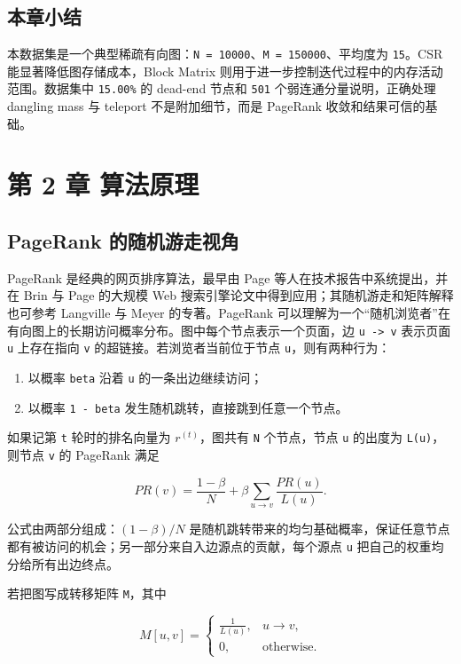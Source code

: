 \documentclass[UTF8,a4paper,12pt]{ctexart}
\begin{document}
\subsection{本章小结}


本数据集是一个典型稀疏有向图：\texttt{N = 10000}、\texttt{M = 150000}、平均度为 \texttt{15}。CSR 能显著降低图存储成本，Block Matrix 则用于进一步控制迭代过程中的内存活动范围。数据集中 \texttt{15.00\%} 的 dead-end 节点和 \texttt{501} 个弱连通分量说明，正确处理 dangling mass 与 teleport 不是附加细节，而是 PageRank 收敛和结果可信的基础。

\section{第 2 章 算法原理}


\subsection{PageRank 的随机游走视角}


PageRank 是经典的网页排序算法，最早由 Page 等人在技术报告中系统提出，并在 Brin 与 Page 的大规模 Web 搜索引擎论文中得到应用；其随机游走和矩阵解释也可参考 Langville 与 Meyer 的专著\cite{page1999pagerank,brin1998anatomy,langville2006google}。PageRank 可以理解为一个“随机浏览者”在有向图上的长期访问概率分布。图中每个节点表示一个页面，边 \texttt{u -> v} 表示页面 \texttt{u} 上存在指向 \texttt{v} 的超链接。若浏览者当前位于节点 \texttt{u}，则有两种行为：


\begin{enumerate}
\item 以概率 \texttt{beta} 沿着 \texttt{u} 的一条出边继续访问；
\item 以概率 \texttt{1 - beta} 发生随机跳转，直接跳到任意一个节点。
\end{enumerate}


如果记第 \texttt{t} 轮时的排名向量为 $r^{(t)}$，图共有 \texttt{N} 个节点，节点 \texttt{u} 的出度为 \texttt{L(u)}，则节点 \texttt{v} 的 PageRank 满足


\[ PR(v)=\frac{1-\beta}{N}+\beta \sum_{u \to v}\frac{PR(u)}{L(u)}. \]


公式由两部分组成：$(1-\beta)/N$ 是随机跳转带来的均匀基础概率，保证任意节点都有被访问的机会；另一部分来自入边源点的贡献，每个源点 \texttt{u} 把自己的权重均分给所有出边终点。


若把图写成转移矩阵 \texttt{M}，其中


\[
M[u,v]=
\begin{cases}
\frac{1}{L(u)}, & u \to v,\\
0, & \text{otherwise}.
\end{cases}
\]
\end{document}
